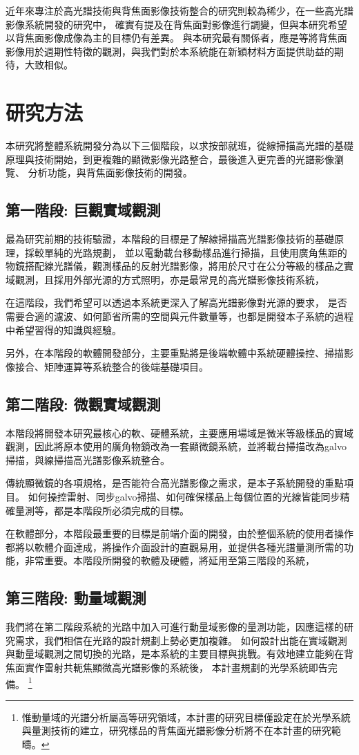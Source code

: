\documentclass[12pt]{article}
\begin{document}
近年來專注於高光譜技術與背焦面影像技術整合的研究則較為稀少，在一些高光譜影像系統開發的研究中，
確實有提及在背焦面對影像進行調變\cite{gao2010snapshot}，但與本研究希望以背焦面影像成像為主的目標仍有差異。
與本研究最有關係者，應是\cite{phdthesis}等將背焦面影像用於週期性特徵的觀測，與我們對於本系統能在新穎材料方面提供助益的期待，大致相似。

\section{研究方法}
本研究將整體系統開發分為以下三個階段，以求按部就班，從線掃描高光譜的基礎原理與技術開始，到更複雜的顯微影像光路整合，最後進入更完善的光譜影像瀏覽、
分析功能，與背焦面影像技術的開發。
\subsection{第一階段: 巨觀實域觀測} \label{macroreal}
最為研究前期的技術驗證，本階段的目標是了解線掃描高光譜影像技術的基礎原理，採較單純的光路規劃，
並以電動載台移動樣品進行掃描，且使用廣角焦距的物鏡搭配線光譜儀，觀測樣品的反射光譜影像，將用於尺寸在公分等級的樣品之實域觀測，且採用外部光源的方式照明，亦是最常見的高光譜影像技術系統，

在這階段，我們希望可以透過本系統更深入了解高光譜影像對光源的要求，
是否需要合適的濾波、如何節省所需的空間與元件數量等，也都是開發本子系統的過程中希望習得的知識與經驗。

另外，在本階段的軟體開發部分，主要重點將是後端軟體中系統硬體操控、掃描影像接合、矩陣運算等系統整合的後端基礎項目。
\subsection{第二階段: 微觀實域觀測} \label{microreal}
本階段將開發本研究最核心的軟、硬體系統，主要應用場域是微米等級樣品的實域觀測，因此將原本使用的廣角物鏡改為一套顯微鏡系統，並將載台掃描改為galvo掃描，與線掃描高光譜影像系統整合。

傳統顯微鏡的各項規格，是否能符合高光譜影像之需求，是本子系統開發的重點項目。
如何操控雷射、同步galvo掃描、如何確保樣品上每個位置的光線皆能同步精確量測等，都是本階段所必須完成的目標。

在軟體部分，本階段最重要的目標是前端介面的開發，由於整個系統的使用者操作都將以軟體介面達成，將操作介面設計的直觀易用，並提供各種光譜量測所需的功能，非常重要。本階段所開發的軟體及硬體，將延用至第三階段的系統，

\subsection{第三階段: 動量域觀測} \label{momentum}
我們將在第二階段系統的光路中加入可進行動量域影像的量測功能，因應這樣的研究需求，我們相信在光路的設計規劃上勢必更加複雜。
如何設計出能在實域觀測與動量域觀測之間切換的光路，是本系統的主要目標與挑戰。有效地建立能夠在背焦面實作雷射共軛焦顯微高光譜影像的系統後，
本計畫規劃的光學系統即告完備。
\footnote{惟動量域的光譜分析屬高等研究領域，本計畫的研究目標僅設定在於光學系統與量測技術的建立，研究樣品的背焦面光譜影像分析將不在本計畫的研究範疇。}
\end{document}
